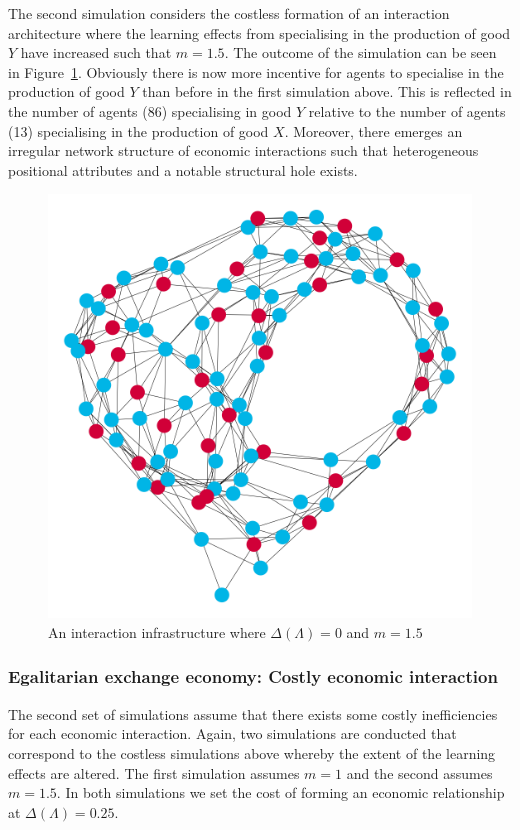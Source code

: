 The second simulation considers the costless formation of an interaction architecture where the learning effects from specialising in the production of good $Y$ have increased such that $m = 1.5$. The outcome of the simulation can be seen in Figure~\ref{Sim2}. Obviously there is now more incentive for agents to specialise in the production of good $Y$ than before in the first simulation above. This is reflected in the number of agents (86) specialising in good $Y$ relative to the number of agents (13) specialising in the production of good $X$. Moreover, there emerges an irregular network structure of economic interactions such that heterogeneous positional attributes and a notable structural hole exists.

\begin{figure}[t]
\centering
\includegraphics[scale=0.22]{Images/Sim2E.png}
\caption{An interaction infrastructure where $\Delta(\Lambda)=0$ and $m=1.5$}
\label{Sim2}
\end{figure}

\subsubsection{Egalitarian exchange economy: Costly economic interaction}

The second set of simulations assume that there exists some costly inefficiencies for each economic interaction. Again, two simulations are conducted that correspond to the costless simulations above whereby the extent of the learning effects are altered. The first simulation assumes $m = 1$ and the second assumes $m = 1.5$. In both simulations we set the cost of forming an economic relationship at $\Delta(\Lambda) = 0.25$.

